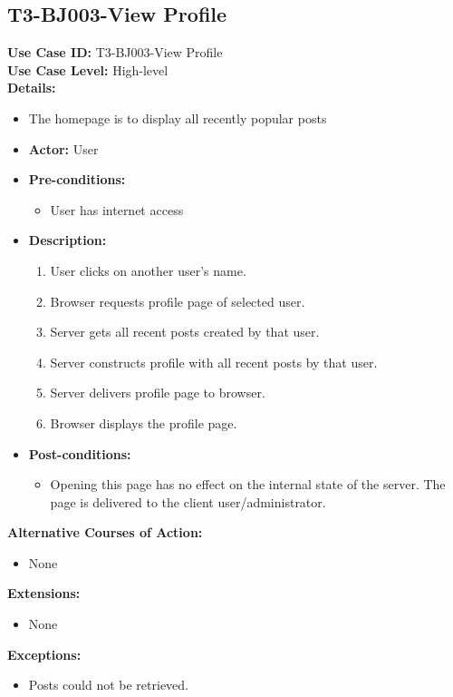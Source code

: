\subsection{T3-BJ003-View Profile}
\textbf{Use Case ID:} T3-BJ003-View Profile\\
\textbf{Use Case Level:} High-level\\
\textbf{Details:}
\begin{itemize}
    \item The homepage is to display all recently popular posts
    \item \textbf{Actor:} User
    \item \textbf{Pre-conditions:}
    \begin{itemize}
        \item User has internet access
    \end{itemize}
    \item \textbf{Description:}
    \begin{enumerate}
        \item User clicks on another user’s name.
        \item Browser requests profile page of selected user.
        \item Server gets all recent posts created by that user.
        \item Server constructs profile with all recent posts by that user.
        \item Server delivers profile page to browser.
        \item Browser displays the profile page.
    \end{enumerate}
    \item \textbf{Post-conditions:}
    \begin{itemize}
        \item Opening this page has no effect on the internal state of the server. The page is delivered to the client user/administrator.
    \end{itemize}
\end{itemize}
\textbf{Alternative Courses of Action:}
\begin{itemize}
    \item None
\end{itemize}
\textbf{Extensions:}
\begin{itemize}
    \item None
\end{itemize}
\textbf{Exceptions:}
\begin{itemize}
    \item Posts could not be retrieved.
\end{itemize}
